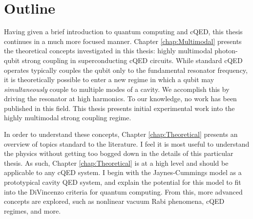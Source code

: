 \documentclass[11 pt, oneside]{book} %
\begin{document}
%




\section{Outline}
Having given a brief introduction to quantum computing and cQED, this thesis continues in a much more focused manner. Chapter \ref{chap:Multimodal} presents the theoretical concepts investigated in this thesis: highly multimodal photon-qubit strong coupling in superconducting cQED circuits. While standard cQED operates typically couples the qubit only to the fundamental resonator frequency, it is theoretically possible to enter a new regime in which a qubit may \emph{simultaneously} couple to multiple modes of a cavity. We accomplish this by driving the resonator at high harmonics. To our knowledge, no work has been published in this field.  This thesis presents initial experimental work into the highly multimodal strong coupling regime. 


In order to understand these concepts, Chapter \ref{chap:Theoretical} presents an overview of topics standard to the literature. I feel it is most useful to understand the physics without getting too bogged down in the details of this particular thesis. As such, Chapter \ref{chap:Theoretical} is at a high level and should be applicable to any cQED system. I begin with the Jaynes-Cummings model as a prototypical cavity QED system, and explain the potential for this model to fit into the DiVincenzo criteria for quantum computing. From this, more advanced concepts are explored, such as nonlinear vacuum Rabi phenomena, cQED regimes, and more. 
\end{document}
